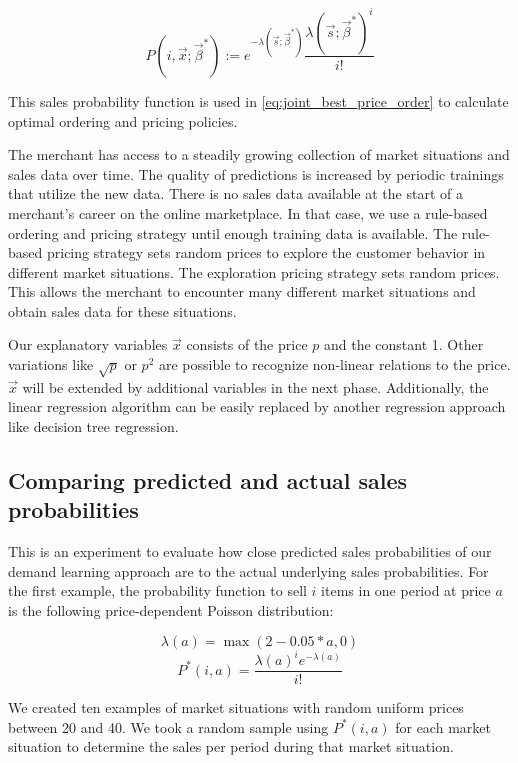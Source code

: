 \begin{equation}
\label{eq:probability}
P(i, \vec{x}; \vec{\beta}^*) :=
	e^{-\lambda(\vec{s}; \vec{\beta}^*)}
	\frac{\lambda(\vec{s}; \vec{\beta}^*)^{i}}{i!}
\end{equation}

This sales probability function is used in \cref{eq:joint_best_price_order} to calculate optimal ordering and pricing policies.

The merchant has access to a steadily growing collection of market situations and sales data over time.
The quality of predictions is increased by periodic trainings that utilize the new data.
There is no sales data available at the start of a merchant's career on the online marketplace.
In that case, we use a rule-based ordering and pricing strategy until enough training data is available.
The rule-based pricing strategy sets random prices to explore the customer behavior in different market situations.
The exploration pricing strategy sets random prices.
This allows the merchant to encounter many different market situations and obtain sales data for these situations.

Our explanatory variables $\vec{x}$ consists of the price $p$ and the constant 1.
Other variations like $\sqrt{p}$ or $p^2$ are possible to recognize non-linear relations to the price.
$\vec{x}$ will be extended by additional variables in the next phase.
Additionally, the linear regression algorithm can be easily replaced by another regression approach like decision tree regression.

\subsection{Comparing predicted and actual sales probabilities}

This is an experiment to evaluate how close predicted sales probabilities of our demand learning approach are to the actual underlying sales probabilities.
For the first example, the probability function to sell $i$ items in one period at price $a$ is the following price-dependent Poisson distribution:

$$
\lambda(a) = \max(2 - 0.05*a, 0)
$$
$$
P^*(i, a) = \frac{\lambda(a)^ie^{-\lambda(a)}}{i!}
$$

We created ten examples of market situations with random uniform prices between 20 and 40.
We took a random sample using $P^*(i, a)$ for each market situation to determine the sales per period during that market situation.

